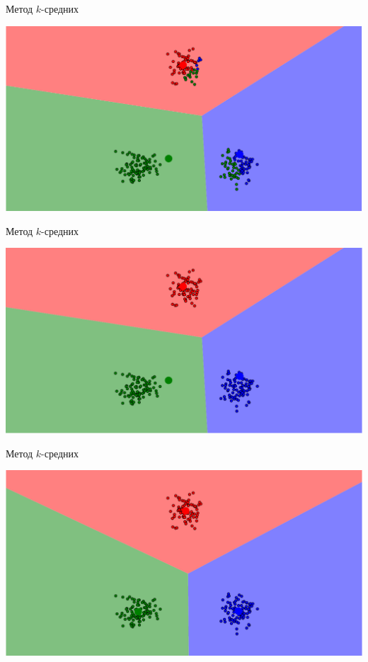 \documentclass[10pt]{beamer}
\begin{document}
\begin{frame}{Метод $k$-средних}
	\begin{center}
	  \includegraphics[width= \textwidth, keepaspectratio = true]{images/kmeans2}   
	\end{center}
\end{frame}

\begin{frame}{Метод $k$-средних}
	\begin{center}
	  \includegraphics[width= \textwidth, keepaspectratio = true]{images/kmeans3}   
	\end{center}
\end{frame}

\begin{frame}{Метод $k$-средних}
	\begin{center}
	  \includegraphics[width= \textwidth, keepaspectratio = true]{images/kmeans4}   
	\end{center}
\end{frame}
\end{document}
